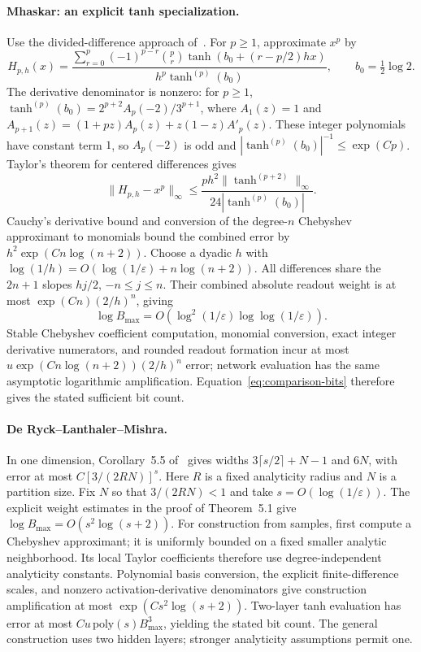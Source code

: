 \paragraph{Mhaskar: an explicit tanh specialization.}
Use the divided-difference approach of~\cite{mhaskar1996}. For $p\ge1$,
approximate $x^p$ by
\begin{equation}
 H_{p,h}(x)=
 \frac{\sum_{r=0}^{p}(-1)^{p-r}\binom{p}{r}
 \tanh\!\left(b_0+(r-p/2)hx\right)}
 {h^p\tanh^{(p)}(b_0)},
 \qquad b_0=\tfrac12\log 2.
\end{equation}
The derivative denominator is nonzero: for $p\ge1$,
$\tanh^{(p)}(b_0)=2^{p+2}A_p(-2)/3^{p+1}$, where
$A_1(z)=1$ and
$A_{p+1}(z)=(1+pz)A_p(z)+z(1-z)A'_p(z)$.
These integer polynomials have constant term $1$, so $A_p(-2)$ is odd and
$|\tanh^{(p)}(b_0)|^{-1}\le\exp(Cp)$.
Taylor's theorem for centered differences gives
\[
 \|H_{p,h}-x^p\|_\infty
 \le \frac{ph^2\|\tanh^{(p+2)}\|_\infty}
 {24|\tanh^{(p)}(b_0)|}.
\]
Cauchy's derivative bound and conversion of the degree-$n$ Chebyshev
approximant to monomials bound the combined error by
$h^2\exp(Cn\log(n+2))$. Choose a dyadic $h$ with
$\log(1/h)=O(\log(1/\varepsilon)+n\log(n+2))$.
All differences share the $2n+1$ slopes $hj/2$, $-n\le j\le n$.
Their combined absolute readout weight is at most $\exp(Cn)(2/h)^n$, giving
\[
 \log B_{\max}
 =O\!\left(\log^2(1/\varepsilon)\log\log(1/\varepsilon)\right).
\]
Stable Chebyshev coefficient computation, monomial conversion, exact integer
derivative numerators, and rounded readout formation incur at most
$u\exp(Cn\log(n+2))(2/h)^n$ error; network evaluation has the same
asymptotic logarithmic amplification. Equation~\eqref{eq:comparison-bits}
therefore gives the stated sufficient bit count.

\paragraph{De Ryck--Lanthaler--Mishra.}
In one dimension, Corollary~5.5 of~\cite{deryck2021} gives widths
$3\lceil s/2\rceil+N-1$ and $6N$, with error at most
$C[3/(2RN)]^s$. Here $R$ is a fixed analyticity radius and $N$ is a partition
size. Fix $N$ so that $3/(2RN)<1$ and take
$s=O(\log(1/\varepsilon))$. The explicit weight estimates in the proof of
Theorem~5.1 give $\log B_{\max}=O(s^2\log(s+2))$.
For construction from samples, first compute a Chebyshev approximant; it is
uniformly bounded on a fixed smaller analytic neighborhood. Its local Taylor
coefficients therefore use degree-independent analyticity constants.
Polynomial basis conversion, the explicit finite-difference scales, and
nonzero activation-derivative denominators give construction amplification
at most $\exp(Cs^2\log(s+2))$.
Two-layer tanh evaluation has error at most
$Cu\,\mathrm{poly}(s)B_{\max}^3$, yielding the stated bit count.
The general construction uses two hidden layers; stronger analyticity
assumptions permit one.

